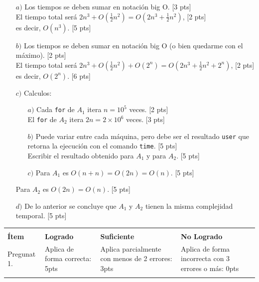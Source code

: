 \documentclass{exam}
\begin{document}
\begin{enumerate}
\begin{questions}
\begin{itemize}
    \item[$a)$] Los tiempos se deben sumar en notación big O.\tabto{82ex} [3 pts]\\
    El tiempo total será $2n^3+O(\frac{1}{2}n^2)=O(2n^3+\frac{1}{2}n^2)$,\tabto{82ex} [2 pts]\\
    es decir, $O(n^3)$.\tabto{82ex} [5 pts]
    \item[$b)$] Los tiempos se deben sumar en notación big O (o bien quedarme con el máximo).\tabto{82ex} [2 pts]\\
    El tiempo total será $2n^3+O(\frac{1}{2}n^2)+O(2^n)=O(2n^3+\frac{1}{2}n^2+2^n)$,\tabto{82ex} [2 pts]\\
    es decir, $O(2^n)$.\tabto{82ex} [6 pts]
    \item[$c)$] Calculos:
  \begin{enumerate}
    \item[$a)$] Cada \texttt{for} de $A_1$ itera $n=10^5$ veces. \tabto{82ex} [2 pts]\\
    El \texttt{for} de $A_2$ itera $2n=2\times10^6$ veces. \tabto{82ex} [3 pts]
    \item[$b)$] Puede variar entre cada máquina, pero debe ser el resultado \texttt{user} que retorna la ejecución con el comando \texttt{time}. \tabto{82ex} [5 pts]\\
    Escribir el resultado obtenido para $A_1$ y para $A_2$. \tabto{82ex} [5 pts]
    \item[$c)$] Para $A_1$ es $O(n+n)=O(2n)=O(n)$.\tabto{82ex} [5 pts]\\
  \end{enumerate}
    Para $A_2$ es $O(2n)=O(n)$.\tabto{82ex} [5 pts]
    \item[$d)$] De lo anterior se concluye que $A_1$ y $A_2$ tienen la misma complejidad temporal.\tabto{82ex} [5 pts]\\
\end{itemize}

\end{questions}

\begin{table}[H]
  \centering
  \begin{tabular}{
    !{\color{gray!50}\vrule}p{3.9cm}
    !{\color{gray!50}\vrule}p{3.6cm}
    !{\color{gray!50}\vrule}p{3.6cm}
    !{\color{gray!50}\vrule}p{3.6cm}
    !{\color{gray!50}\vrule}}  \hline
     \\ 
    \hline
    \textbf{Ítem} & \textbf{Logrado} & \textbf{Suficiente} & \textbf{No Logrado}\\  \hline\newline
    Pregunat 1. &
    Aplica de forma correcta: 5pts   &
    Aplica parcialmente con menos de 2 errores: 3pts  &
    Aplica de forma incorrecta con 3 errores o más: 0pts \\  \hline


\end{tabular}
\end{table}
\end{enumerate}
\end{document}
